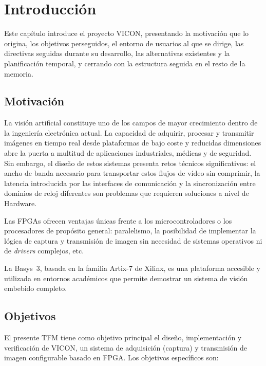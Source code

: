 \documentclass[../main.tex]{subfiles}
\begin{document}
\chapter{Introducción}
\label{chap:introduccion}

Este capítulo introduce el proyecto \ac{VICON}, presentando la motivación que lo origina, los objetivos perseguidos, el entorno de usuarios al que se dirige, las directivas seguidas durante su desarrollo, las alternativas existentes y la planificación temporal, y cerrando con la estructura seguida en el resto de la memoria.

\section{Motivación}

La visión artificial constituye uno de los campos de mayor crecimiento dentro de la ingeniería electrónica actual. 
La capacidad de adquirir, procesar y transmitir imágenes en tiempo real desde plataformas de bajo coste y reducidas dimensiones abre la puerta a multitud de aplicaciones industriales, médicas y de seguridad. Sin embargo, el diseño de estos sistemas presenta retos técnicos significativos: el ancho de banda necesario para transportar estos flujos de vídeo sin comprimir, la latencia introducida por las interfaces de comunicación y la sincronización entre dominios de reloj diferentes son problemas que requieren soluciones a nivel de Hardware.

Las \ac{FPGA}s ofrecen ventajas únicas frente a los microcontroladores o los procesadores de propósito general: paralelismo, la posibilidad de implementar la lógica de captura y transmisión de imagen sin necesidad de sistemas operativos ni de \textit{drivers} complejos, etc.

La Basys~3, basada en la familia Artix-7 de Xilinx, es una plataforma accesible y utilizada en entornos académicos que permite demostrar un sistema de visión embebido completo.

\section{Objetivos}

El presente \ac{TFM} tiene como objetivo principal el diseño, implementación y verificación de \ac{VICON}, un sistema de adquisición (captura) y transmisión de imagen configurable basado en \ac{FPGA}. Los objetivos específicos son:
\end{document}
